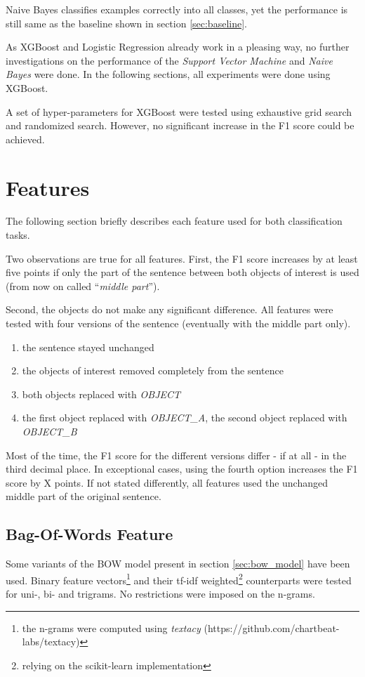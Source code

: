 Naive Bayes classifies examples correctly into all classes, yet the performance is still same as the baseline shown in section \ref{sec:baseline}.

As XGBoost and Logistic Regression already work in a pleasing way, no further investigations on the performance of the \emph{Support Vector Machine} and \emph{Naive Bayes} were done. In the following sections, all experiments were done using XGBoost.

A set of hyper-parameters for XGBoost were tested using exhaustive grid search and randomized search. However, no significant increase in the F1 score could be achieved.








\section{Features}
The following section briefly describes each feature used for both classification tasks. 

Two observations are true for all features. First, the F1 score increases by at least five points if only the part of the sentence between both objects of interest is used (from now on called \enquote{\emph{middle part}}).

 Second, the objects do not make any significant difference. All features were tested with four versions of the sentence (eventually with the middle part only). 
\begin{enumerate}
\item the sentence stayed unchanged
\item the objects of interest removed completely from the sentence
\item both objects replaced with \emph{OBJECT}
\item the first object replaced with \emph{OBJECT\_A}, the second object replaced with \emph{OBJECT\_B}
\end{enumerate}
Most of the time, the F1 score for the different versions differ - if at all - in the third decimal place. In exceptional cases, using the fourth option increases the F1 score by X points. If not stated differently, all features used the unchanged middle part of the original sentence.


\subsection{Bag-Of-Words Feature}
Some variants of the BOW model present in section \ref{sec:bow_model} have been used. Binary feature vectors\footnote{the n-grams were computed using \emph{textacy} (https://github.com/chartbeat-labs/textacy)} and their tf-idf weighted\footnote{relying on the scikit-learn implementation} counterparts were tested for uni-, bi- and trigrams. No restrictions were imposed on the n-grams.

